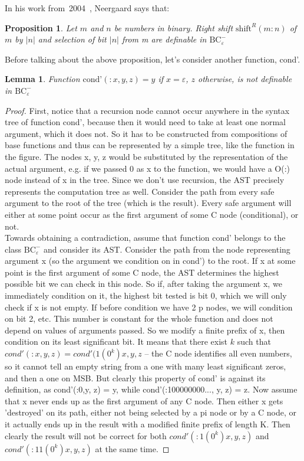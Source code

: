 \documentclass[en]  {pracamgr}
\newcommand{\bcem}{\ensuremath{\text{BC}_{\varepsilon}^-}}
\newtheorem{lemma}[thm]{Lemma}
\newtheorem{prop}{Proposition}
\begin{document}
In his work from~2004~\cite{10.1007/978-3-540-30477-7_21}, Neergaard says that: 
\begin{prop}
  Let $m$ and $n$ be numbers in binary. Right shift $\text{shift}^R(m:n)$ of $m$ by $|n|$ and selection of bit $|n|$
from m are definable in \bcem
\end{prop}

Before talking about the above proposition, let's consider another function, cond'.

% 

\begin{lemma}
  Function $\text{cond'}(:x, y, z) = y$ if $x = \varepsilon$, $z$ otherwise, is not definable in \bcem
\end{lemma}
\begin{proof}
  First, notice that a recursion node cannot occur anywhere in the syntax tree of function cond', because then it would need to take at least one normal argument, which it does not. So it has to be constructed from compositions of base functions and thus can be represented by a simple tree, like the function in the figure. The nodes x, y, z would be substituted by the representation of the actual argument, e.g. if we passed 0 as x to the function, we would have a O(:) node 
  instead of x in the tree. Since we don't use recursion, the AST precisely represents the computation tree as well. Consider the path from every safe argument to the root of the tree (which is the result). Every safe argument will either at some point occur as the first argument of some C node (conditional), or not. \\
  Towards obtaining a contradiction, assume that function cond' belongs to the class $\bcem$ and consider its AST.
  Consider the path from the node representing argument x (so the argument we condition on in cond') to the root.
If x at some point is the first argument of some C node, the AST determines the highest possible bit we can check in this node. So if, after taking the argument x, we immediately condition on it, the highest bit tested is bit 0, which we will only check if x is not empty. If before condition we have 2 p nodes, we will condition on bit 2, etc. This number is constant for the whole function and does not depend on values of arguments passed. So we modify a finite prefix of x, then condition on its least significant bit. It means that there exist $k$ such that $cond'(:x, y, z) = cond'(1(0^k)x, y, z$ -- the C node identifies all even numbers, so it cannot tell an empty string from a one with many least significant zeros, and then a one on MSB. But clearly this property of cond' is against its definition, as cond'(:0,y, z) = y, while cond'(:100000000..., y, z) = z.
  Now assume that x never ends up as the first argument of any C node. Then either x gets 'destroyed' on its path, either not being selected by a pi node or by a C node, or it actually ends up in the result with a modified finite prefix of length K. Then clearly the result will not be correct for both $cond'(:1(0^k)x, y, z)$ and $cond'(:11(0^k)x, y, z)$ at the same time.
\end{proof}
\end{document}
